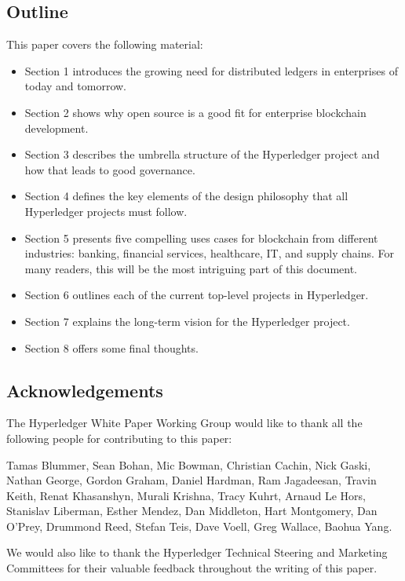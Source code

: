 \subsection{Outline}
This paper covers the following material: 
\begin{itemize}
\item Section 1 introduces the growing need for distributed ledgers in enterprises of today and tomorrow.
\item Section 2 shows why open source is a good fit for enterprise blockchain development.
\item Section 3 describes the umbrella structure of the Hyperledger project and how that leads to good governance.
\item Section 4 defines the key elements of the design philosophy that all Hyperledger projects must follow.
\item Section 5 presents five compelling uses cases for blockchain from different industries: banking, financial services, healthcare, IT, and supply chains. For many readers, this will be the most intriguing part of this document. 
\item Section 6 outlines each of the current top-level projects in Hyperledger.
\item Section 7 explains the long-term vision for the Hyperledger project.
\item Section 8 offers some final thoughts.
\end{itemize}

\subsection{Acknowledgements}
The Hyperledger White Paper Working Group would like to thank all the following people for contributing to this paper:

Tamas Blummer, Sean Bohan, Mic Bowman, Christian Cachin, Nick Gaski, Nathan George, Gordon Graham, Daniel Hardman, Ram Jagadeesan, Travin Keith, Renat Khasanshyn, Murali Krishna, Tracy Kuhrt, Arnaud Le Hors, Stanislav Liberman, Esther Mendez, Dan Middleton, Hart Montgomery, Dan O'Prey, Drummond Reed, Stefan Teis, Dave Voell, Greg Wallace, Baohua Yang.

We would also like to thank the Hyperledger Technical Steering and Marketing Committees for their valuable feedback throughout the writing of this paper.

